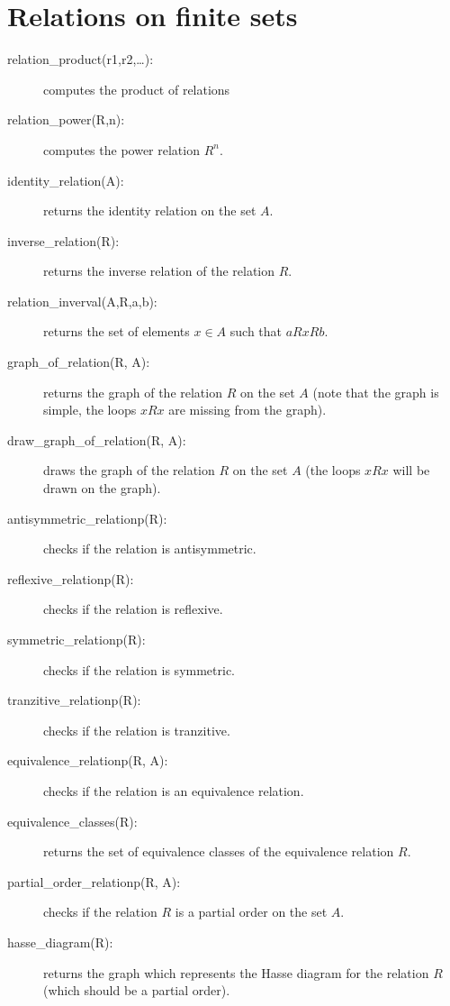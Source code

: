 \documentclass[11pt]{article}
\begin{document}
\section{Relations on finite sets}

\begin{description}
  \item[relation\_product(r1,r2,\ldots):] computes the product of
    relations
  \item[relation\_power(R,n):] computes the power relation $R^n$.
  \item[identity\_relation(A):] returns the identity relation on the
    set $A$.
  \item[inverse\_relation(R):] returns the inverse relation of the
    relation $R$.
  \item[relation\_inverval(A,R,a,b):] returns the set of elements
    $x\in A$ such that $a R x R b$.
  \item[graph\_of\_relation(R, A):] returns the graph of the relation
    $R$ on the set $A$ (note that the graph is simple, the loops $xRx$
    are missing from the graph).
  \item[draw\_graph\_of\_relation(R, A):] draws the graph of the
    relation $R$ on the set $A$ (the loops $xRx$ will be drawn on the
    graph).
  \item[antisymmetric\_relationp(R):] checks if the relation is
    antisymmetric.
  \item[reflexive\_relationp(R):] checks if the relation is reflexive.
  \item[symmetric\_relationp(R):] checks if the relation is symmetric.
  \item[tranzitive\_relationp(R):] checks if the relation is
    tranzitive.
  \item[equivalence\_relationp(R, A):] checks if the relation is an
    equivalence relation.
  \item[equivalence\_classes(R):] returns the set of equivalence
    classes of the equivalence relation $R$.
  \item[partial\_order\_relationp(R, A):] checks if the relation $R$
    is a partial order on the set $A$.
  \item[hasse\_diagram(R):] returns the graph which represents the
    Hasse diagram for the relation $R$ (which should be a partial
    order).
\end{description}

\end{document}
